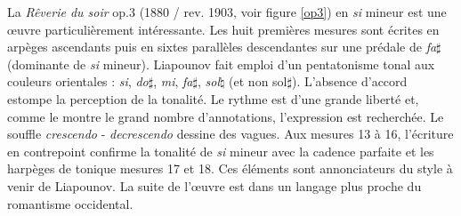 \newpage

La \emph{Rêverie du soir} op.3 (1880 / rev. 1903, voir figure \ref{op3}) en \emph{si} mineur est une œuvre particulièrement intéressante. Les huit premières mesures sont écrites en arpèges ascendants puis en sixtes parallèles descendantes sur une prédale de \emph{fa}$\sharp$ (dominante de \emph{si} mineur). Liapounov fait emploi d'un pentatonisme tonal aux couleurs orientales : \emph{si}, \emph{do}$\sharp$, \emph{mi}, \emph{fa}$\sharp$, \emph{sol}$\natural$ (et non sol$\sharp$). L'absence d'accord estompe la perception de la tonalité. Le rythme est d'une grande liberté et, comme le montre le grand nombre d'annotations, l'expression est recherchée. Le souffle \emph{crescendo} - \emph{decrescendo} dessine des vagues. Aux mesures 13 à 16, l'écriture en contrepoint confirme la tonalité de \emph{si} mineur avec la cadence parfaite et les harpèges de tonique mesures 17 et 18. Ces éléments sont annonciateurs du style à venir de Liapounov. La suite de l'œuvre est dans un langage plus proche du romantisme occidental. 

